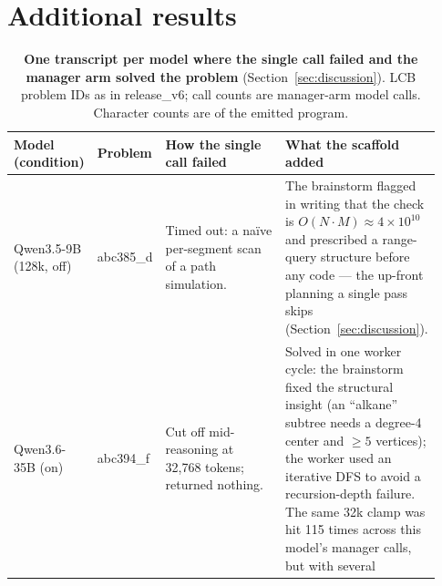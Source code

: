 \documentclass{article}
\begin{document}
\section{Additional results}
\label{app:results}







\begin{table}[p]
\centering
\caption{\textbf{One transcript per model where the single call failed and the manager arm solved
the problem} (Section~\ref{sec:discussion}). LCB problem IDs as in release\_v6; call counts are
manager-arm model calls. Character counts are of the emitted program.}
\label{tab:transcripts}
\footnotesize
\setlength{\tabcolsep}{4pt}
\setlength{\defaultaddspace}{2.5pt}
\begin{tabular}{@{}p{0.155\linewidth}p{0.101\linewidth}p{0.310\linewidth}p{0.364\linewidth}@{}}
\toprule
\textbf{Model} \newline \textbf{(condition)} & \textbf{Problem} & \textbf{How the single call failed} &
\textbf{What the scaffold added} \\
\midrule
Qwen3.5-9B \newline (128k, off) & abc385\_d & Timed out: a na\"ive per-segment scan of a path
simulation. & The brainstorm flagged in writing that the check is $O(N\cdot M) \approx
4\times10^{10}$ and prescribed a range-query structure before any code --- the up-front
planning a single pass skips (Section~\ref{sec:discussion}). \\
\addlinespace
Qwen3.6-35B \newline (on) & abc394\_f & Cut off mid-reasoning at 32,768 tokens; returned nothing. &
Solved in one worker cycle: the brainstorm fixed the structural insight (an ``alkane'' subtree needs
a degree-4 center and $\ge 5$ vertices); the worker used an iterative DFS to avoid a recursion-depth
failure. The same 32k clamp was hit 115 times across this model's manager calls, but with several

\end{tabular}
\end{table}
\end{document}
